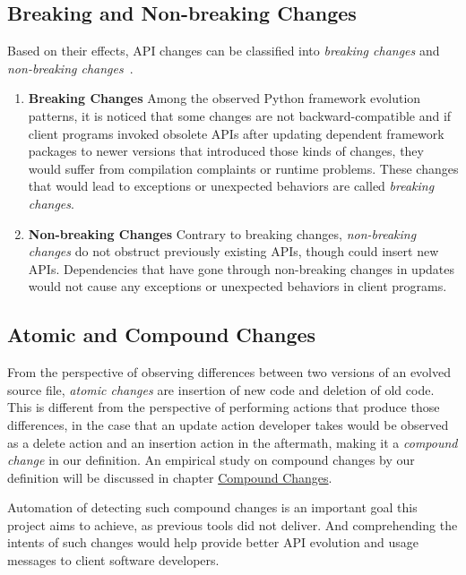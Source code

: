 \subsection{Breaking and Non-breaking Changes}

Based on their effects, API changes can be classified into \textit{breaking changes} and \textit{non-breaking changes}~\cite{api-evo-refactoring}.

\begin{enumerate}
	\item \textbf{Breaking Changes} Among the observed Python framework evolution patterns, it is noticed that some changes are not backward-compatible and if client programs invoked obsolete APIs after updating dependent framework packages to newer versions that introduced those kinds of changes, they would suffer from compilation complaints or runtime problems. These changes that would lead to exceptions or unexpected behaviors are called \textit{breaking changes}.
	\item \textbf{Non-breaking Changes} Contrary to breaking changes, \textit{non-breaking changes} do not obstruct previously existing APIs, though could insert new APIs. Dependencies that have gone through non-breaking changes in updates would not cause any exceptions or unexpected behaviors in client programs.
\end{enumerate}

\subsection{Atomic and Compound Changes}

From the perspective of observing differences between two versions of an evolved source file, \textit{atomic changes} are insertion of new code and deletion of old code. This is different from the perspective of performing actions that produce those differences, in the case that an update action developer takes would be observed as a delete action and an insertion action in the aftermath, making it a \textit{compound change} in our definition. An empirical study on compound changes by our definition will be discussed in chapter \hyperref[chap:compound-changes]{Compound Changes}.

Automation of detecting such compound changes is an important goal this project aims to achieve, as previous tools did not deliver. And comprehending the intents of such changes would help provide better API evolution and usage messages to client software developers.

